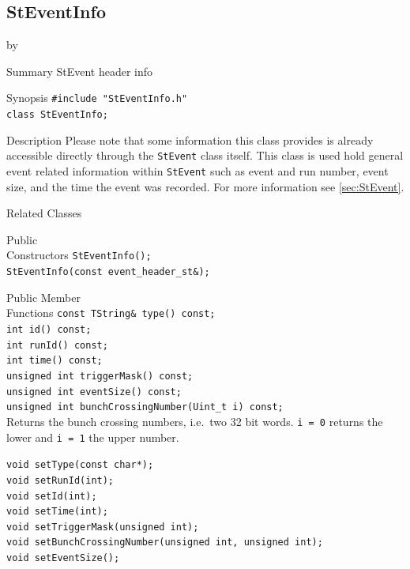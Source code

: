 \documentclass[twoside]{article}
\newcommand{\entrylabel}[1]{\mbox{\textbf{{#1}}}\hfil}%
\newenvironment{entry}
{\begin{list}{}%
    {\renewcommand{\makelabel}{\entrylabel}%
     \setlength{\labelwidth}{90pt}%
     \setlength{\leftmargin}{\labelwidth}
     \advance\leftmargin by \labelsep%
      }%
    }%
  {\end{list}}
\newcommand{\Entrylabel}[1]%
{\raisebox{0pt}[1ex][0pt]{\makebox[\labelwidth][l]%
    {\parbox[t]{\labelwidth}{\hspace{0pt}\textbf{{#1}}}}}}
\newenvironment{Entry}%
{\renewcommand{\entrylabel}{\Entrylabel}\begin{entry}}%
  {\end{entry}}
\begin{document}
\subsection{StEventInfo}
\label{sec:StEventInfo}
\begin{Entry}
\item[Summary] StEvent header info

\item[Synopsis]
    \verb+#include "StEventInfo.h"+\\
    \verb+class StEventInfo;+\\
    
\item[Description]
    Please note that some information this class
    provides is already accessible directly through the
    \texttt{StEvent} class itself. This class is used hold general
    event related information within \texttt{StEvent} such as event
    and run number, event size, and the time the event was recorded.
    For more information see \ref{sec:StEvent}.

\item[Related Classes]
\item[Public\\ Constructors]
    \verb+StEventInfo();+\\
    \verb+StEventInfo(const event_header_st&);+\\
\item[Public Member\\ Functions]
    \verb+const TString& type() const;+\\
    \verb+int id() const;+\\
    \verb+int runId() const;+\\
    \verb+int time() const;+\\
    \verb+unsigned int triggerMask() const;+\\
    \verb+unsigned int eventSize() const;+\\

    \verb+unsigned int bunchCrossingNumber(Uint_t i) const;+\\
    Returns the bunch crossing numbers, i.e.~two 32 bit words.
    \texttt{i = 0} returns the lower and \texttt{i = 1} the upper number.

    \verb+void setType(const char*);+\\
    \verb+void setRunId(int);+\\
    \verb+void setId(int);+\\
    \verb+void setTime(int);+\\
    \verb+void setTriggerMask(unsigned int);+\\
    \verb+void setBunchCrossingNumber(unsigned int, unsigned int);+\\
    \verb+void setEventSize();+\\
\end{Entry}
\clearpage
\end{document}
